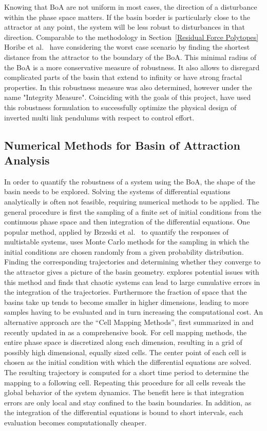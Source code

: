 Knowing that BoA are not uniform in most cases, the direction of a disturbance within the phase space matters. If the basin border is particularly close to the attractor at any point, the system will be less robust to disturbances in that direction. Comparable to the methodology in Section~\ref{Residual Force Polytopes} Horibe et al.\ \cite{quant} have considering the worst case scenario by finding the shortest distance from the attractor to the boundary of the BoA.
This minimal radius of the BoA is a more conservative measure of robustness. It also allows to disregard complicated parts of the basin that extend to infinity or have strong fractal properties. In \cite{integr} this robustness measure was also determined, however under the name "Integrity Measure".
Coinciding with the goals of this project, \cite{quant} have used this robustness formulation to successfully optimize the physical design of inverted multi link pendulums with respect to control effort.
 
\subsection{Numerical Methods for Basin of Attraction Analysis} \label{Numerical Methods}
In order to quantify the robustness of a system using the BoA, the shape of the basin needs to be explored. Solving the systems of differential equations analytically is often not feasible, requiring numerical methods to be applied. The general procedure is first the sampling of a finite set of initial conditions from the continuous phase space and then integration of the differential equations. One popular method, applied by Brzeski et al.\ \cite{multistable} to quantify the responses of multistable systems, uses Monte Carlo methods for the sampling in which the initial conditions are chosen randomly from a given probability distribution. Finding the corresponding trajectories and determining whether they converge to the attractor gives a picture of the basin geometry. \cite{limitsBoA} explores potential issues with this method and finds that chaotic systems can lead to large cumulative errors in the integration of the trajectories. Furthermore the fraction of space that the basins take up tends to become smaller in higher dimensions, leading to more samples having to be evaluated and in turn increasing the computational cost.
An alternative approach are the “Cell Mapping Methods”, first summarized in \cite{cell1} and recently updated in \cite{cell2} as a comprehensive book. For cell mapping methods, the entire phase space is discretized along each dimension, resulting in a grid of possibly high dimensional, equally sized cells. The center point of each cell is chosen as the initial condition with which the differential equations are solved. The resulting trajectory is computed for a short time period to determine the mapping to a following cell. Repeating this procedure for all cells reveals the global behavior of the system dynamics. The benefit here is that integration errors are only local and stay confined to the basin boundaries. In addition, as the integration of the differential equations is bound to short intervals, each evaluation becomes computationally cheaper.

